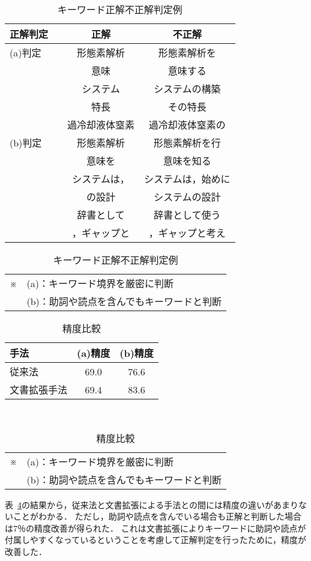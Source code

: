 \documentclass[japanese]{jnlp_1.2c}
\begin{document}
\begin{table}[b]
	\centering
	\caption{キーワード正解不正解判定例}
	\begin{tabular}{l|c|c}
		正解判定　& 正解 & 不正解 \\ \hline
		(a)判定 & 形態素解析 & 形態素解析を \\
		　 & 意味 & 意味する \\
		　 & システム & システムの構築 \\
		　 & 特長 & その特長 \\
		　 & 過冷却液体窒素 & 過冷却液体窒素の\\ \hline
		(b)判定 & 形態素解析 & 形態素解析を行 \\
		　 & 意味を & 意味を知る \\
		　 & システムは， & システムは，始めに \\
		　 & の設計 & システムの設計 \\
		　 & 辞書として & 辞書として使う\\
		　 &  ，ギャップと & ，ギャップと考え  \\
	\end{tabular}
	\begin{tabular}{cl}
	※ & (a)：キーワード境界を厳密に判断 \\
	& (b)：助詞や読点を含んでもキーワードと判断 \\
	\end{tabular}
	\label{tab:keyword-judge}
\end{table}

\begin{table}[t]
	\centering
	\caption{精度比較}
	\begin{tabular}{l|cc}
		手法　& (a)精度 & (b)精度 \\ \hline
		従来法 & 69.0 & 76.6 \\ 
		文書拡張手法 & 69.4 & 83.6 \\ 
	\end{tabular}
	\\
	\begin{tabular}{cl}
	※ & (a)：キーワード境界を厳密に判断 \\
	& (b)：助詞や読点を含んでもキーワードと判断 \\
	\end{tabular}
	\label{tab:precision}
\end{table}

表~\ref{tab:precision}の結果から，従来法と文書拡張による手法との間には精度の違いがあまりないことがわかる．
ただし，助詞や読点を含んでいる場合も正解と判断した場合は7％の精度改善が得られた．
これは文書拡張によりキーワードに助詞や読点が付属しやすくなっているということを考慮して正解判定を行ったために，精度が改善した．
\end{document}
